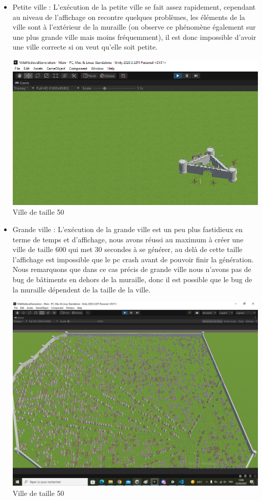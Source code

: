 \begin{itemize}
	\item Petite ville : L'exécution de la petite ville se fait assez rapidement, cependant au niveau de l'affichage on recontre quelques problèmes, les éléments de la ville sont à l'extérieur de la muraille (on observe ce phénomène également sur une plus grande ville mais moins fréquemment), il est donc impossible d'avoir une ville correcte si on veut qu'elle soit petite.
	
\begin{center}
	\centering
    \includegraphics[height = 5 cm]{images/testville.png}\\
	\small{Ville de taille 50}
\end{center}

	\item Grande ville : L'exécution de la grande ville est un peu plus fastidieux en terme de temps et d'affichage, nous avons réussi au maximum à créer une ville de taille 600 qui met 30 secondes à se générer, au delà de cette taille l'affichage est impossible que le pc crash avant de pouvoir finir la génération. Nous remarquons que dans ce cas précis de grande ville nous n'avons pas de bug de bâtiments en dehors de la muraille, donc il est possible que le bug de la muraille dépendent de la taille de la ville.
	
\begin{center}
	\centering
    \includegraphics[height = 5 cm]{images/testville2.png}\\
	\small{Ville de taille 50}
\end{center}


\end{itemize}
